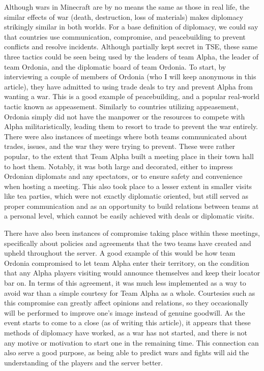 Although wars in Minecraft are by no means the same as those in real life, the similar effects of war (death, destruction, loss of materials) makes diplomacy strikingly similar in both worlds. For a base definition of diplomacy, we could say that countries use communication, compromise, and peacebuilding to prevent conflicts and resolve incidents. Although partially kept secret in TSE, these same three tactics could be seen being used by the leaders of team Alpha, the leader of team Ordonia, and the diplomatic board of team Ordonia. To start, by interviewing a couple of members of Ordonia (who I will keep anonymous in this article), they have admitted to using trade deals to try and prevent Alpha from wanting a war. This is a good example of peacebuilding, and a popular real-world tactic known as appeasement. Similarly to countries utilizing appeasement, Ordonia simply did not have the manpower or the resources to compete with Alpha militaristically, leading them to resort to trade to prevent the war entirely. There were also instances of meetings where both teams communicated about trades, issues, and the war they were trying to prevent. These were rather popular, to the extent that Team Alpha built a meeting place in their town hall to host them. Notably, it was both large and decorated, either to impress Ordonian diplomats and any spectators, or to ensure safety and convenience when hosting a meeting. This also took place to a lesser extent in smaller visits like tea parties, which were not exactly diplomatic oriented, but still served as proper communication and as an opportunity to build relations between teams at a personal level, which cannot be easily achieved with deals or diplomatic visits.

There have also been instances of compromise taking place within these meetings, specifically about policies and agreements that the two teams have created and upheld throughout the server. A good example of this would be how team Ordonia compromised to let team Alpha enter their territory, on the condition that any Alpha players visiting would announce themselves and keep their locator bar on. In terms of this agreement, it was much less implemented as a way to avoid war than a simple courtesy for Team Alpha as a whole. Courtesies such as this compromise can greatly affect opinions and relations, so they occasionally will be performed to improve one’s image instead of genuine goodwill. As the event starts to come to a close (as of writing this article), it appears that these methods of diplomacy have worked, as a war has not started, and there is not any motive or motivation to start one in the remaining time. This connection can also serve a good purpose, as being able to predict wars and fights will aid the understanding of the players and the server better.

